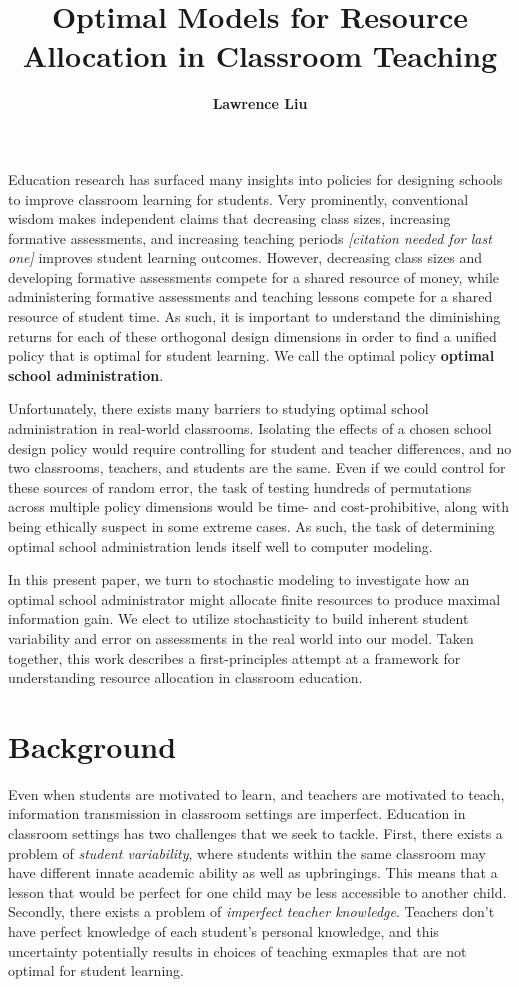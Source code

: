 \documentclass[10pt, letterpaper]{apa6}
\date{}
\title{\textbf{Optimal Models for Resource Allocation in Classroom Teaching}}
\author{{\large \bf Lawrence Liu} \And {\large \bf Michael C. Frank}}
\begin{document}
\maketitle

Education research has surfaced many insights into policies for
designing schools to improve classroom learning for students. Very
prominently, conventional wisdom makes independent claims that
decreasing class sizes, increasing formative assessments, and increasing
teaching periods \emph{{[}citation needed for last one{]}} improves
student learning outcomes. However, decreasing class sizes and
developing formative assessments compete for a shared resource of money,
while administering formative assessments and teaching lessons compete
for a shared resource of student time. As such, it is important to
understand the diminishing returns for each of these orthogonal design
dimensions in order to find a unified policy that is optimal for student
learning. We call the optimal policy \textbf{optimal school
administration}.

Unfortunately, there exists many barriers to studying optimal school
administration in real-world classrooms. Isolating the effects of a
chosen school design policy would require controlling for student and
teacher differences, and no two classrooms, teachers, and students are
the same. Even if we could control for these sources of random error,
the task of testing hundreds of permutations across multiple policy
dimensions would be time- and cost-prohibitive, along with being
ethically suspect in some extreme cases. As such, the task of
determining optimal school administration lends itself well to computer
modeling.

In this present paper, we turn to stochastic modeling to investigate how
an optimal school administrator might allocate finite resources to
produce maximal information gain. We elect to utilize stochasticity to
build inherent student variability and error on assessments in the real
world into our model. Taken together, this work describes a
first-principles attempt at a framework for understanding resource
allocation in classroom education.

\section{Background}\label{background}

Even when students are motivated to learn, and teachers are motivated to
teach, information transmission in classroom settings are imperfect.
Education in classroom settings has two challenges that we seek to
tackle. First, there exists a problem of \emph{student variability},
where students within the same classroom may have different innate
academic ability as well as upbringings. This means that a lesson that
would be perfect for one child may be less accessible to another child.
Secondly, there exists a problem of \emph{imperfect teacher knowledge}.
Teachers don't have perfect knowledge of each student's personal
knowledge, and this uncertainty potentially results in choices of
teaching exmaples that are not optimal for student learning.
\end{document}
